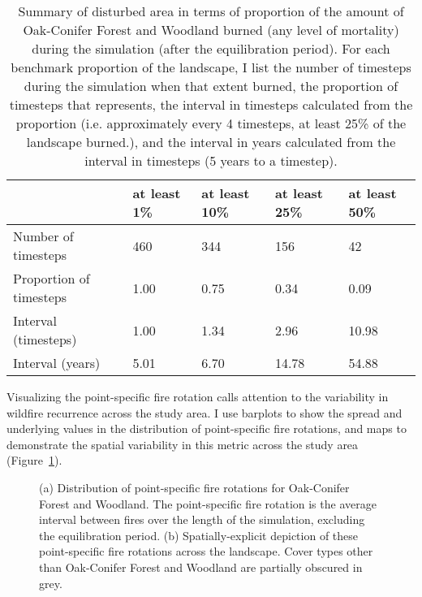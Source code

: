 \begin{table}[!htbp]
\small
\centering
\caption{Summary of disturbed area in terms of proportion of the amount of Oak-Conifer Forest and Woodland burned (any level of mortality) during the simulation (after the equilibration period). For each benchmark proportion of the landscape, I list the number of timesteps during the simulation when that extent burned, the proportion of timesteps that represents, the interval in timesteps calculated from the proportion (i.e. approximately every 4 timesteps, at least 25\% of the landscape burned.), and the interval in years calculated from the interval in timesteps (5 years to a timestep).}
\label{tab:darea_atleast_ocfw}
\begin{tabular}{@{}lllll@{}}
                        & at least 1\% & at least 10\% & at least 25\% & at least 50\% \\ \midrule
Number of timesteps     & 460          & 344           & 156           & 42           \\
Proportion of timesteps & 1.00         & 0.75          & 0.34          & 0.09         \\
Interval (timesteps)    & 1.00         & 1.34          & 2.96          & 10.98        \\
Interval (years)        & 5.01         & 6.70          & 14.78         & 54.88        \\ \bottomrule
\end{tabular}
\end{table}

Visualizing the point-specific fire rotation calls attention to the variability in wildfire recurrence across the study area. I use barplots to show the spread and underlying values in the distribution of point-specific fire rotations, and maps to demonstrate the spatial variability in this metric across the study area (Figure~\ref{fig:preturn_ocfw}). 

\begin{figure}[!htbp]
  \centering
  \caption{(a) Distribution of point-specific fire rotations for Oak-Conifer Forest and Woodland. The point-specific fire rotation is the average interval between fires over the length of the simulation, excluding the equilibration period. (b) Spatially-explicit depiction of these point-specific fire rotations across the landscape. Cover types other than Oak-Conifer Forest and Woodland are partially obscured in grey.}
\label{fig:preturn_ocfw}
\end{figure}

